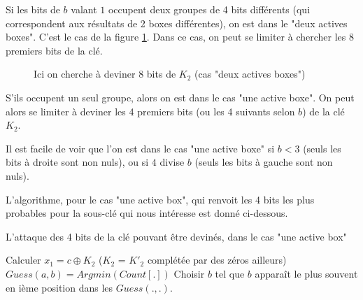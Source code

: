 Si les bits de $b$ valant $1$ occupent deux groupes de 4 bits différents (qui correspondent aux résultats de 2 boxes différentes), on est dans le "deux actives boxes". C'est le cas de la figure \ref{illustration_bits_key}. Dans ce cas, on peut se limiter à chercher les 8 premiers bits de la clé.


\begin{figure}[!ht]
\centering
{}
\caption{Ici on cherche à deviner 8 bits de $K_2$ (cas "deux actives boxes")}
\label{illustration_bits_key}
\end{figure}


S'ils occupent un seul groupe, alors on est dans le cas "une active boxe". On peut alors se limiter à deviner les 4 premiers bits (ou les 4 suivants selon $b$) de la clé $K_2$.

Il est facile de voir que l'on est dans le cas "une active boxe" si $b < 3$ (seuls les bits à droite sont non nuls), ou si $4$ divise $b$ (seuls les bits à gauche sont non nuls). 

L'algorithme, pour le cas "une active box", qui renvoit les 4 bits les plus probables pour la sous-clé qui nous intéresse est donné ci-dessous.

\begin{algorithm}
\caption{L'attaque des 4 bits de la clé pouvant être devinés, dans le cas "une active box"}
	{
		{
			Calculer $x_1 = c \oplus K_2$ ($K_2$ = $K'_2$ complétée par des zéros ailleurs) \\
		}
		$Guess(a,b) = Argmin \left( Count[.] \right)$
	}
	{
		Choisir $b$ tel que $b$ apparaît le plus souvent en ième position dans les $Guess(.,.)$.
	}
\end{algorithm}

